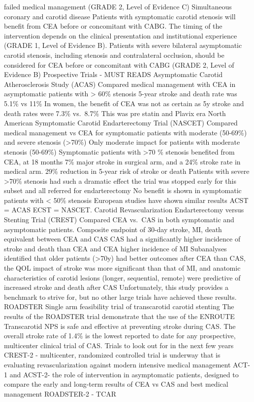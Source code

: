 \documentclass[
]{book}
\theoremstyle{definition}
\theoremstyle{definition}
\theoremstyle{definition}
\theoremstyle{definition}
\theoremstyle{remark}
\begin{document}
failed medical management (GRADE 2, Level of Evidence C) Simultaneous
coronary and carotid disease Patients with symptomatic carotid stenosis
will benefit from CEA before or concomitant with CABG. The timing of the
intervention depends on the clinical presentation and institutional
experience (GRADE 1, Level of Evidence B). Patients with severe
bilateral asymptomatic carotid stenosis, including stenosis and
contralateral occlusion, should be considered for CEA before or
concomitant with CABG (GRADE 2, Level of Evidence B) Prospective Trials
- MUST READS Asymptomatic Carotid Atherosclerosis Study (ACAS) Compared
medical management with CEA in asymptomatic patients with \textgreater{} 60\%
stenosis 5-year stroke and death rate was 5.1\% vs 11\% In women, the
benefit of CEA was not as certain as 5y stroke and death rates were 7.3\%
vs.~8.7\% This was pre statin and Plavix era North American Symptomatic
Carotid Endarterectomy Trial (NASCET) Compared medical management vs CEA
for symptomatic patients with moderate (50-69\%) and severe stenosis
(\textgreater70\%) Only moderate impact for patients with moderate stenosis (50-69\%)
Symptomatic patients with \textgreater70 \% stenosis benefited from CEA, at 18
months 7\% major stroke in surgical arm, and a 24\% stroke rate in medical
arm. 29\% reduction in 5-year risk of stroke or death Patients with
severe \textgreater70\% stenosis had such a dramatic effect the trial was stopped
early for this subset and all referred for endarterectomy No benefit is
shown in symptomatic patients with \textless{} 50\% stenosis European studies have
shown similar results ACST = ACAS ECST = NASCET. Carotid
Revascularization Endarterectomy versus Stenting Trial (CREST) Compared
CEA vs.~CAS in both symptomatic and asymptomatic patients. Composite
endpoint of 30-day stroke, MI, death equivalent between CEA and CAS CAS
had a significantly higher incidence of stroke and death than CEA and
CEA higher incidence of MI Subanalyses identified that older patients
(\textgreater70y) had better outcomes after CEA than CAS, the QOL impact of stroke
was more significant than that of MI, and anatomic characteristics of
carotid lesions (longer, sequential, remote) were predictive of
increased stroke and death after CAS Unfortunately, this study provides
a benchmark to strive for, but no other large trials have achieved these
results. ROADSTER Single arm feasibility trial of transcarotid carotid
stenting The results of the ROADSTER trial demonstrate that the use of
the ENROUTE Transcarotid NPS is safe and effective at preventing stroke
during CAS. The overall stroke rate of 1.4\% is the lowest reported to
date for any prospective, multicenter clinical trial of CAS. Trials to
look out for in the next few years CREST-2 - multicenter, randomized
controlled trial is underway that is evaluating revascularization
against modern intensive medical management ACT-1 and ACST-2- the role
of intervention in asymptomatic patients, designed to compare the early
and long-term results of CEA vs CAS and best medical management
ROADSTER-2 - TCAR
\end{document}
